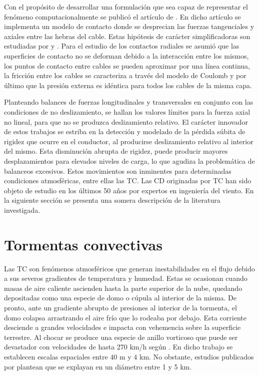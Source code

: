 Con el propósito de desarrollar una formulación que sea capaz de representar el fenómeno computacionalmente se publicó el artículo de \cite{Foti2016}. En dicho artículo se implementa un modelo de contacto donde se desprecian las fuerzas tangenciales y axiales entre las hebras del cable. Estas hipótesis de carácter simplificadoras son estudiadas por \cite{costello1990average} y \cite{rawlins2005flexure}. Para el estudio de los contactos radiales se asumió que las superficies de contacto no se deforman debido a la interacción entre los mismos, los puntos de contacto entre cables se pueden aproximar por una línea continua, la fricción entre los cables se caracteriza a través del modelo de Coulomb y por último que la presión externa es idéntica para todos los cables de la misma capa. 

Planteando balances de fuerzas longitudinales y transversales en conjunto con las condiciones de no deslizamiento, se hallan los valores límites para la fuerza axial no lineal, para que no se produzca deslizamiento relativo. El carácter innovador de estos trabajos se estriba en la detección y modelado de la pérdida súbita de rigidez  que ocurre en el conductor, al producirse deslizamiento relativo al interior del mismo. Esta disminución abrupta de rigidez, puede producir mayores desplazamientos para elevados niveles de carga, lo que agudiza la problemática de balanceos excesivos. Estos movimientos son inminentes para determinadas condiciones atmosféricas, entre ellas las TC. Las CD originadas por TC han sido objeto de estudio en los últimos 50 años por expertos en ingeniería del viento. En la siguiente sección se presenta una somera descripción de la literatura investigada. 

\section{Tormentas convectivas}\label{Sec:EA:TormentasConvectivas}

Las TC son fenómenos atmosféricos que generan inestabilidades en el flujo debido a sus severos gradientes de temperatura y humedad. Estas se ocasionan cuando masas de aire caliente ascienden hasta la parte superior de la nube, quedando depositadas como una especie de domo o cúpula al interior de la misma. De pronto, ante un gradiente abrupto de presiones al interior de la tormenta, el domo colapsa arrastrando el aire frío que lo rodeaba por debajo. Esta corriente desciende a grandes velocidades e impacta con vehemencia sobre la superficie terrestre. Al chocar se produce una especie de anillo vorticoso que puede ser devastador con velocidades de hasta 270 km/h según \cite{fujita1985downburst}. En dicho trabajo se establecen escalas espaciales entre $40$ m y $4$ km. No obstante, estudios publicados por \cite{darwish2010dynamic} plantean que se explayan en un diámetro entre 1 y 5 km.

